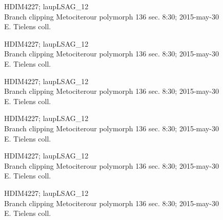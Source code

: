 \documentclass[2pt]{extarticle}
\begin{document}
\noindent
\parbox{0.16\textwidth}{\tiny \raggedright \rule[-0.3\baselineskip]{0pt}{10pt}HDIM4227; laupLSAG\_12\\ Branch clipping Metociterour polymorph 136 sec. 8:30; 2015-may-30\\ E. Tielens coll.}
\parbox{0.16\textwidth}{\tiny \raggedright \rule[-0.3\baselineskip]{0pt}{10pt}HDIM4227; laupLSAG\_12\\ Branch clipping Metociterour polymorph 136 sec. 8:30; 2015-may-30\\ E. Tielens coll.}
\parbox{0.16\textwidth}{\tiny \raggedright \rule[-0.3\baselineskip]{0pt}{10pt}HDIM4227; laupLSAG\_12\\ Branch clipping Metociterour polymorph 136 sec. 8:30; 2015-may-30\\ E. Tielens coll.}
\parbox{0.16\textwidth}{\tiny \raggedright \rule[-0.3\baselineskip]{0pt}{10pt}HDIM4227; laupLSAG\_12\\ Branch clipping Metociterour polymorph 136 sec. 8:30; 2015-may-30\\ E. Tielens coll.}
\parbox{0.16\textwidth}{\tiny \raggedright \rule[-0.3\baselineskip]{0pt}{10pt}HDIM4227; laupLSAG\_12\\ Branch clipping Metociterour polymorph 136 sec. 8:30; 2015-may-30\\ E. Tielens coll.}
\parbox{0.16\textwidth}{\tiny \raggedright \rule[-0.3\baselineskip]{0pt}{10pt}HDIM4227; laupLSAG\_12\\ Branch clipping Metociterour polymorph 136 sec. 8:30; 2015-may-30\\ E. Tielens coll.} \\ 
\vspace{0.001in} 
\end{document}
